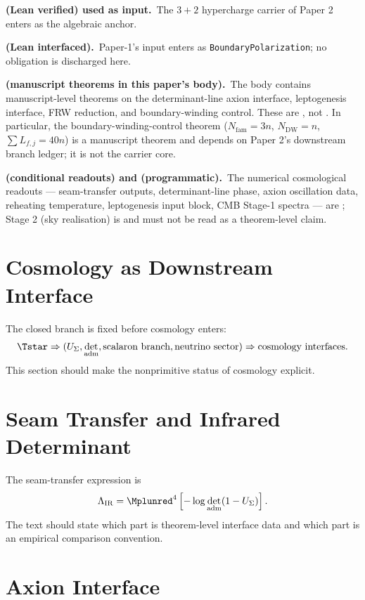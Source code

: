 \begin{tfptstatusbox}
\textbf{ (Lean verified) used as input.}\ The $3+2$
hypercharge carrier of Paper 2 enters as the algebraic anchor.

\smallskip
\textbf{ (Lean interfaced).}\ Paper-1's input enters
as \texttt{BoundaryPolarization}; no  obligation is
discharged here.

\smallskip
\textbf{ (manuscript theorems in this paper's body).}\
The body contains manuscript-level theorems on the
determinant-line axion interface, leptogenesis interface,
FRW reduction, and boundary-winding control. These are
, not . In particular, the
boundary-winding-control theorem
($N_{\mathrm{fam}} = 3n$, $N_{\mathrm{DW}} = n$,
$\sum L_{f,j} = 40n$) is a manuscript theorem and depends on
Paper 2's  downstream branch ledger; it is not the
 carrier core.

\smallskip
\textbf{ (conditional readouts) and 
(programmatic).}\ The numerical cosmological readouts ---
seam-transfer outputs, determinant-line phase, axion
oscillation data, reheating temperature, leptogenesis input
block, CMB Stage-1 spectra --- are ; Stage 2 (sky
realisation) is  and must not be read as a
theorem-level claim.
\end{tfptstatusbox}

\tableofcontents

\section{Cosmology as Downstream Interface}

The closed branch is fixed before cosmology enters:
\[
\Tstar
\Rightarrow
(U_\Sigma,\det_{\mathrm{adm}},\text{scalaron branch},\text{neutrino sector})
\Rightarrow
\text{cosmology interfaces}.
\]
This section should make the nonprimitive status of cosmology explicit.

\section{Seam Transfer and Infrared Determinant}

The seam-transfer expression is
\[
\Lambda_{\mathrm{IR}}
=
\Mplunred^4\left[-\log\det_{\mathrm{adm}}(1-U_\Sigma)\right].
\]
The text should state which part is theorem-level interface data and which part is an empirical
comparison convention.

\section{Axion Interface}

